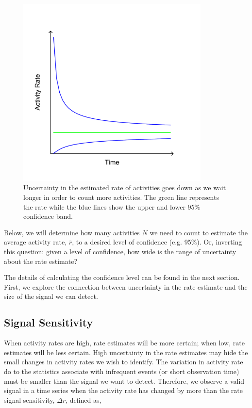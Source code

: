 \documentclass{article}
\begin{document}
%
\begin{figure}[h]
	\begin{center}
		\includegraphics[width=3.8in]{./imgs/fig2.pdf}
	\end{center}
	\caption{Uncertainty in the estimated rate of activities goes down as we wait longer in order to count more activities.  The green line
represents the rate while the blue lines show the upper and lower 95\% confidence band. }
    	\label{fig:confidence}
\end{figure}
%
%

Below, we will determine how many activities $N$ we need to count to estimate the average activity rate, $\bar{r}$, to a desired level
of confidence (e.g. 95\%). Or, inverting this question: given a level of confidence, how wide is the range of uncertainty
about the rate estimate?

The details of calculating the confidence level can be found in the next section.  First, we explore the connection between
uncertainty in the rate estimate and the size of the signal we can detect.

\subsection{Signal Sensitivity}

When activity rates are high, rate estimates will be more certain; when low, rate estimates will be less certain. High uncertainty
in the rate estimates may hide the small changes in activity rates we wish to identify.  The variation in activity rate do to the statistics
associate with infrequent events (or short observation time) must be smaller than the signal we want to detect. Therefore, we observe
a valid signal in a time series when the activity rate has changed by more than the rate signal sensitivity, $\Delta r$, defined as,
\end{document}
